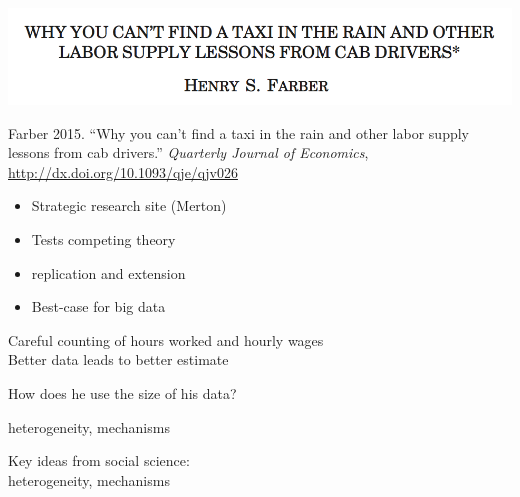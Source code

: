 \documentclass[aspectratio=169]{beamer}
\def\vf{\vfill}
\begin{document}
\begin{frame}

\begin{center}
\includegraphics[width=\textwidth]{figures/farber_why_2015_title}
\end{center}

\vf
Farber 2015. ``Why you can't find a taxi in the rain and other labor supply lessons from cab drivers.'' \textit{Quarterly Journal of Economics}, \url{http://dx.doi.org/10.1093/qje/qjv026}

\end{frame}
\begin{frame}

\begin{itemize}
\item Strategic research site (Merton)
\pause
\item Tests competing theory
\pause
\item replication and extension
\pause
\item Best-case for big data
\end{itemize}

\end{frame}
\begin{frame}

Careful counting of hours worked and hourly wages\\
Better data leads to better estimate

\end{frame}
\begin{frame}

{\Large
\begin{center}
How does he use the size of his data?
\end{center}
}
\pause
heterogeneity, mechanisms

\end{frame}
\begin{frame}

{\Large
\begin{center}
Key ideas from social science:\\
heterogeneity, mechanisms
\end{center}
}

\end{frame}
\end{document}

